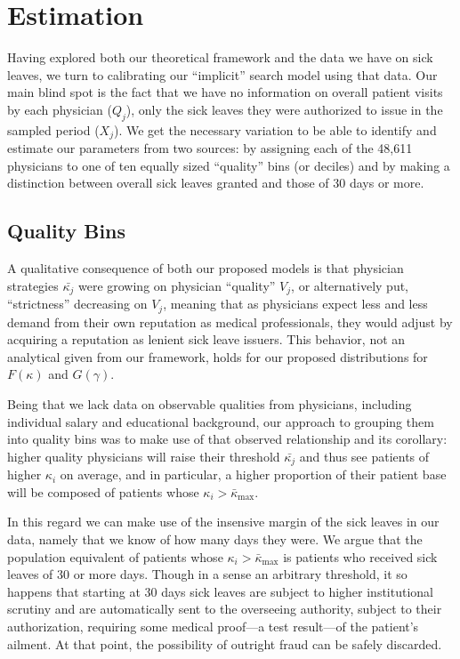 \documentclass[../main.tex]{subfiles}
\begin{document}
\section{Estimation}

Having explored both our theoretical framework and the data we have on sick leaves, we turn to calibrating our ``implicit'' search model using that data. Our main blind spot is the fact that we have no information on overall patient visits by each physician ($Q_j$), only the sick leaves they were authorized to issue in the sampled period ($X_j$). We get the necessary variation to be able to identify and estimate our parameters from two sources: by assigning each of the 48,611 physicians to one of ten equally sized ``quality'' bins (or deciles) and by making a distinction between overall sick leaves granted and those of 30 days or more.

\subsection{Quality Bins}

A qualitative consequence of both our proposed models is that physician strategies $\bar{\kappa_j}$ were growing on physician ``quality'' $V_j$, or alternatively put, ``strictness'' decreasing on $V_j$, meaning that as physicians expect less and less demand from their own reputation as medical professionals, they would adjust by acquiring a reputation as lenient sick leave issuers. This behavior, not an analytical given from our framework, holds for our proposed distributions for $F(\kappa)$ and $G(\gamma)$.

Being that we lack data on observable qualities from physicians, including individual salary and educational background, our approach to grouping them into quality bins was to make use of that observed relationship and its corollary: higher quality physicians will raise their threshold $\bar{\kappa_j}$ and thus see patients of higher $\kappa_i$ on average, and in particular, a higher proportion of their patient base will be composed of patients whose $\kappa_i > \bar{\kappa}_{\max}$.

In this regard we can make use of the insensive margin of the sick leaves in our data, namely that we know of how many days they were. We argue that the population equivalent of patients whose $\kappa_i > \bar{\kappa}_{\max}$ is patients who received sick leaves of 30 or more days. Though in a sense an arbitrary threshold, it so happens that starting at 30 days sick leaves are subject to higher institutional scrutiny and are automatically sent to the overseeing authority, subject to their authorization, requiring some medical proof—a test result—of the patient's ailment. At that point, the possibility of outright fraud can be safely discarded.
\end{document}
